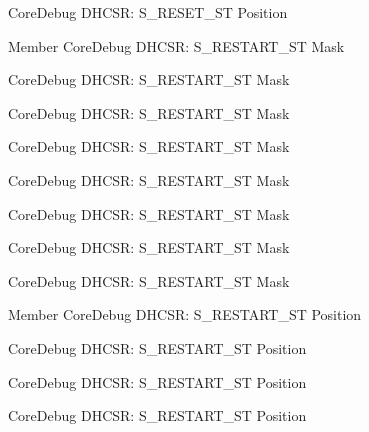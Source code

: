 \begin{DoxyRefList}
\label{deprecated__deprecated000109}%
%
Core\+Debug DHCSR\+: S\+\_\+\+RESET\+\_\+\+ST Position  
\item[Member \doxylink{group__CMSIS__SCB_gabe3254d40aaa482987ff31584d2a3240}{Core\+Debug\+\_\+\+DHCSR\+\_\+\+S\+\_\+\+RESTART\+\_\+\+ST\+\_\+\+Msk} ]\label{deprecated__deprecated000108}%
%
Core\+Debug DHCSR\+: S\+\_\+\+RESTART\+\_\+\+ST Mask 

\label{deprecated__deprecated000162}%
%
Core\+Debug DHCSR\+: S\+\_\+\+RESTART\+\_\+\+ST Mask 

\label{deprecated__deprecated000247}%
%
Core\+Debug DHCSR\+: S\+\_\+\+RESTART\+\_\+\+ST Mask 

\label{deprecated__deprecated000561}%
%
Core\+Debug DHCSR\+: S\+\_\+\+RESTART\+\_\+\+ST Mask 

\label{deprecated__deprecated000380}%
%
Core\+Debug DHCSR\+: S\+\_\+\+RESTART\+\_\+\+ST Mask 

\label{deprecated__deprecated000008}%
%
Core\+Debug DHCSR\+: S\+\_\+\+RESTART\+\_\+\+ST Mask 

\label{deprecated__deprecated000304}%
%
Core\+Debug DHCSR\+: S\+\_\+\+RESTART\+\_\+\+ST Mask 

\label{deprecated__deprecated000459}%
%
Core\+Debug DHCSR\+: S\+\_\+\+RESTART\+\_\+\+ST Mask  
\item[Member \doxylink{group__CMSIS__SCB_gaf6498d32dbe23b8d95a12d2fbc0a65f8}{Core\+Debug\+\_\+\+DHCSR\+\_\+\+S\+\_\+\+RESTART\+\_\+\+ST\+\_\+\+Pos} ]\label{deprecated__deprecated000379}%
%
Core\+Debug DHCSR\+: S\+\_\+\+RESTART\+\_\+\+ST Position 

\label{deprecated__deprecated000458}%
%
Core\+Debug DHCSR\+: S\+\_\+\+RESTART\+\_\+\+ST Position 

\label{deprecated__deprecated000303}%
%
Core\+Debug DHCSR\+: S\+\_\+\+RESTART\+\_\+\+ST Position 

\label{deprecated__deprecated000560}%
%
Core\+Debug DHCSR\+: S\+\_\+\+RESTART\+\_\+\+ST Position 


\end{DoxyRefList}
